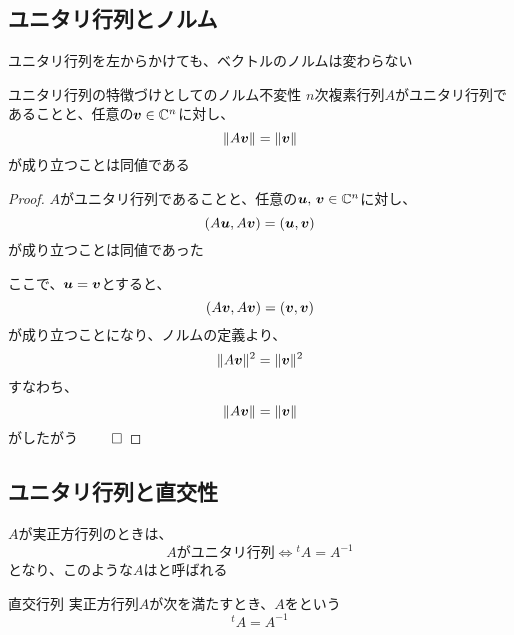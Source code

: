 \documentclass[../../../topic_linear-algebra]{subfiles}
\begin{document}
\subsection{ユニタリ行列とノルム}

ユニタリ行列を左からかけても、ベクトルのノルムは変わらない

\begin{theorem}{ユニタリ行列の特徴づけとしてのノルム不変性}\label{thm:unitary-characterized-by-norm-invariance}
  $n$次複素行列$A$がユニタリ行列であることと、任意の$\vb*{v} \in \mathbb{C}^n$に対し、
  \begin{equation*}
    \|A\vb*{v}\| = \|\vb*{v}\|
  \end{equation*}
  が成り立つことは同値である
\end{theorem}

\begin{proof}
  $A$がユニタリ行列であることと、任意の$\vb*{u},\,\vb*{v} \in \mathbb{C}^n$に対し、
  \begin{equation*}
    (A\vb*{u}, A\vb*{v}) = (\vb*{u}, \vb*{v})
  \end{equation*}
  が成り立つことは同値であった

  ここで、$\vb*{u} = \vb*{v}$とすると、
  \begin{equation*}
    (A\vb*{v}, A\vb*{v}) = (\vb*{v}, \vb*{v})
  \end{equation*}
  が成り立つことになり、ノルムの定義より、
  \begin{equation*}
    \|A\vb*{v}\|^2                 = \|\vb*{v}\|^2
  \end{equation*}
  すなわち、
  \begin{equation*}
    \|A\vb*{v}\| = \|\vb*{v}\|
  \end{equation*}
  がしたがう $\qed$
\end{proof}

\subsection{ユニタリ行列と直交性}

$A$が実正方行列のときは、
\begin{equation*}
  A\text{がユニタリ行列} \Longleftrightarrow {}^tA = A^{-1}
\end{equation*}
となり、このような$A$はと呼ばれる

\begin{definition}{直交行列}
  実正方行列$A$が次を満たすとき、$A$をという
  \begin{equation*}
    {}^t A = A^{-1}
  \end{equation*}
\end{definition}
\end{document}
